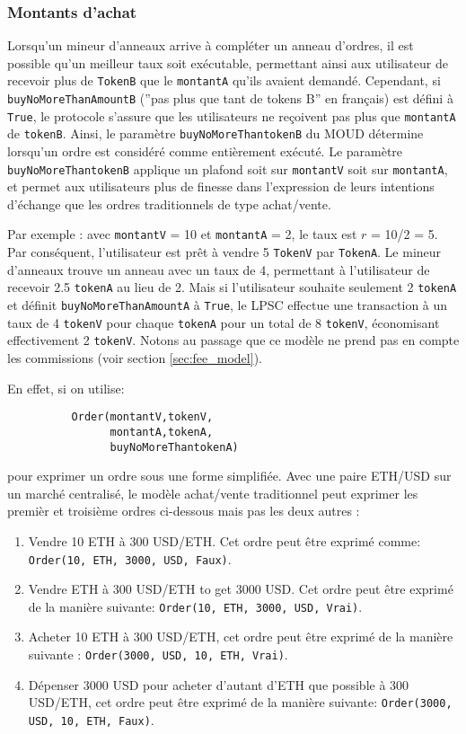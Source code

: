 \documentclass[UTF8,nofonts]{article}
\begin{document}
\begin{multicols}{2}
\subsubsection{Montants d'achat}

Lorsqu'un mineur d'anneaux arrive à compléter un anneau d'ordres, il est possible qu'un meilleur taux soit exécutable, permettant ainsi aux utilisateur de recevoir plus de \verb|TokenB| que le \verb|montantA| qu'ils avaient demandé. Cependant, si \verb|buyNoMoreThanAmountB| (''pas plus que tant de tokens B'' en français) est défini à \verb|True|, le protocole s'assure que les utilisateurs ne reçoivent pas plus que  \verb|montantA| de \verb|tokenB|. Ainsi, le paramètre \verb|buyNoMoreThantokenB| du MOUD détermine lorsqu'un ordre est considéré comme entièrement exécuté. Le paramètre \verb|buyNoMoreThantokenB| applique un plafond soit sur \verb|montantV| soit sur \verb|montantA|, et permet aux utilisateurs plus de finesse dans l'expression de leurs intentions d'échange que les ordres traditionnels de type achat/vente.

Par exemple : avec \verb|montantV| = 10 et \verb|montantA| = 2, le taux est $r$ = 10/2 = 5. Par conséquent, l'utilisateur est prêt à vendre 5 \verb|TokenV| par \verb|TokenA|. Le mineur d'anneaux trouve un anneau avec un taux de 4, permettant à l'utilisateur de recevoir 2.5 \verb|tokenA| au lieu de 2. Mais si l'utilisateur souhaite seulement 2 \verb|tokenA| et définit \verb|buyNoMoreThanAmountA| à \verb|True|, le LPSC effectue une transaction à un taux de 4 \verb|tokenV| pour chaque \verb|tokenA| pour un total de 8 \verb|tokenV|, économisant effectivement 2 \verb|tokenV|. Notons au passage que ce modèle ne prend pas en compte les commissions (voir section \ref{sec:fee_model}).

En effet, si on utilise:


\begin{verbatim}
	      Order(montantV,tokenV,
	            montantA,tokenA,
	            buyNoMoreThantokenA)
\end{verbatim}

pour exprimer un ordre sous une forme simplifiée. Avec une paire ETH/USD sur un marché centralisé, le modèle achat/vente traditionnel peut exprimer les premièr et troisième ordres ci-dessous mais pas les deux autres : 

\begin{enumerate}
	\item Vendre 10 ETH à 300 USD/ETH. Cet ordre peut être exprimé comme: \verb|Order(10, ETH, 3000, USD, Faux)|.
	\item Vendre ETH à 300 USD/ETH to get 3000 USD. Cet ordre peut être exprimé de la manière suivante: \verb|Order(10, ETH, 3000, USD, Vrai)|.
	\item Acheter 10 ETH à 300 USD/ETH, cet ordre peut être exprimé de la manière suivante : \verb|Order(3000, USD, 10, ETH, Vrai)|.
	\item Dépenser 3000 USD pour acheter d'autant d'ETH que possible à 300 USD/ETH, cet ordre peut être exprimé de la manière suivante: \verb|Order(3000, USD, 10, ETH, Faux)|.
\end{enumerate}




\end{multicols}
\end{document}
